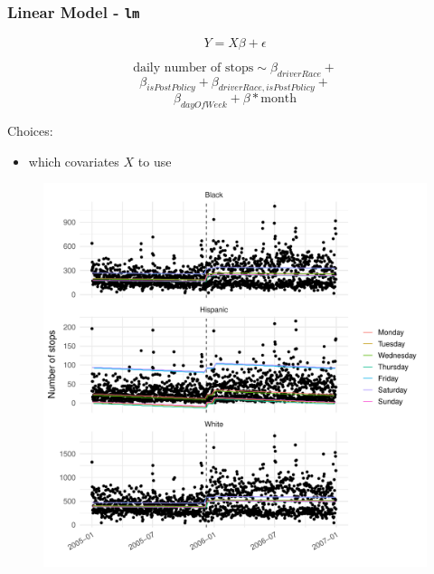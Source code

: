 \documentclass{beamer}
\begin{document}
\begin{frame}
\frametitle{Linear Model - \texttt{lm}}

\begin{multicols}{2}

$$ Y = X\beta +  \epsilon $$

$$\text{daily number of stops} \sim \beta_{driverRace} + $$
$$\beta_{isPostPolicy}+ \beta_{driverRace, isPostPolicy}+$$
$$ \beta_{dayOfWeek} + \beta*\text{month} $$

Choices:

\begin{itemize}
\item which covariates $X$ to use
\end{itemize}

\columnbreak

\begin{figure}
\includegraphics[scale=.3]{figures/lmResults}
\end{figure}

\end{multicols}


\end{frame}
\end{document}
